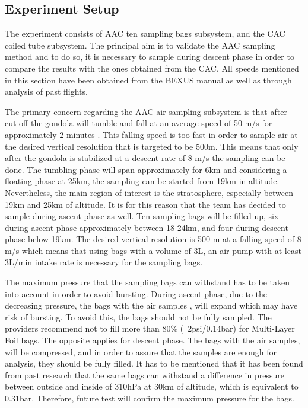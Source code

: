 \subsection{Experiment Setup} \label{Experiment_Setup}

The experiment consists of AAC ten sampling bags subsystem, and the CAC coiled tube subsystem. The principal aim is to validate the AAC sampling method and to do so, it is necessary to sample during descent phase in order to compare the results with the ones obtained from the CAC. All speeds mentioned in this section have been obtained from the BEXUS manual as well as through analysis of past flights.

The primary concern regarding the AAC air sampling subsystem is that after cut-off the gondola will tumble and fall at an average speed of 50 m/s for approximately 2 minutes \cite{BexusManual}. This falling speed is too fast in order to sample air at the desired vertical resolution that is targeted to be 500m. This means that only after the gondola is stabilized at a descent rate of 8 m/s \cite{BexusManual} the sampling can be done. The tumbling phase will span approximately for 6km and considering a floating phase at 25km, the sampling can be started from 19km in altitude. Nevertheless, the main region of interest is the stratosphere, especially between 19km and 25km of altitude. It is for this reason that the team has decided to sample during ascent phase as well. Ten sampling bags will be filled up, six during ascent phase approximately between 18-24km, and four during descent phase below 19km. The desired vertical resolution is 500 m at a falling speed of 8 m/s which means that using bags with a volume of 3L, an air pump with at least 3L/min intake rate is necessary for the sampling bags.

The maximum pressure that the sampling bags can withstand has to be taken into account in order to avoid bursting. During ascent phase, due to the decreasing pressure, the bags with the air samples , will expand which may have risk of bursting. To avoid this, the bags should not be fully sampled. The providers recommend not to fill more than 80\% (~2psi/0.14bar) for Multi-Layer Foil bags. The opposite applies for descent phase. The bags with the air samples, will be compressed, and in order to assure that the samples are enough for analysis, they should be fully filled. It has to be mentioned that it has been found from past research \cite{LISA} that the same bags can withstand a difference in pressure between outside and inside of 310hPa at 30km of altitude, which is equivalent to 0.31bar. Therefore, future test will confirm the maximum pressure for the bags.

